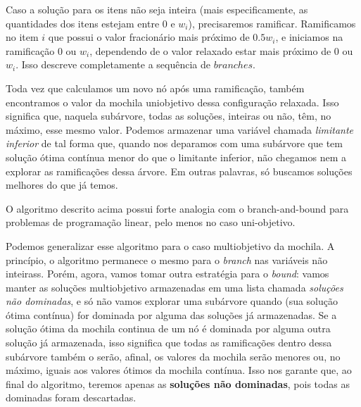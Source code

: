 Caso a solução para os itens não seja inteira (mais especificamente, as quantidades dos itens estejam entre $0$ e $w_i$), precisaremos ramificar. Ramificamos no item $i$ que possui o valor fracionário mais próximo de $0.5w_i$, e iniciamos na ramificação $0$ ou $w_i$, dependendo de o valor relaxado estar mais próximo de  $0$ ou $w_i$. Isso descreve completamente a sequência de $branches$.

Toda vez que calculamos um novo nó após uma ramificação, também encontramos o valor da mochila uniobjetivo dessa configuração relaxada. Isso significa que, naquela subárvore, todas as soluções, inteiras ou não, têm, no máximo, esse mesmo valor. Podemos armazenar uma variável chamada \textit{limitante inferior} de tal forma que, quando nos deparamos com uma subárvore que tem solução ótima contínua menor do que o limitante inferior, não chegamos nem a explorar as ramificações dessa árvore. Em outras palavras, só buscamos soluções melhores do que já temos.

O algoritmo descrito acima possui forte analogia com o branch-and-bound para problemas de programação linear, pelo menos no caso uni-objetivo.

Podemos generalizar esse algoritmo para o caso multiobjetivo da mochila. A princípio, o algoritmo permanece o mesmo para o \textit{branch} nas variáveis não inteirass. Porém, agora, vamos tomar outra estratégia para o \textit{bound}: vamos manter as soluções multiobjetivo armazenadas em uma lista chamada \textit{soluções não dominadas}, e só não vamos explorar uma subárvore quando (sua solução ótima contínua) for dominada por alguma das soluções já armazenadas. Se a solução ótima da mochila continua de um nó é dominada por alguma outra solução já armazenada, isso significa que todas as ramificações dentro dessa subárvore também o serão, afinal, os valores da mochila serão menores ou, no máximo, iguais aos valores ótimos da mochila contínua. Isso nos garante que, ao final do algoritmo, teremos apenas as \textbf{soluções não dominadas}, pois todas as dominadas foram descartadas.

